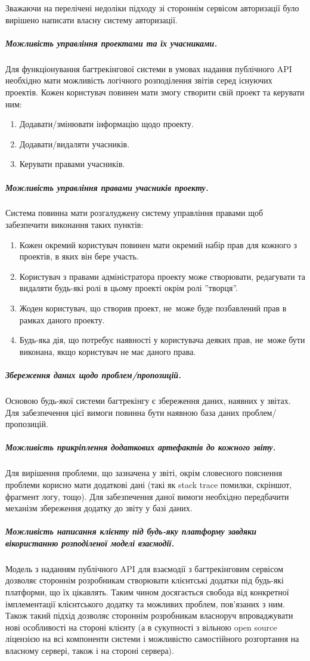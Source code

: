 \documentclass[../main.tex]{subfiles}
\begin{document}
			Зважаючи на перелічені недоліки підходу зі стороннім сервісом авторизації було вирішено написати власну систему авторизації.
		
		\subparagraph{Можливість управління проектами та їх учасниками.}
		Для функціонування багтрекінгової системи в умовах надання публічного API необхідно мати можливість логічного розподілення звітів серед існуючих проектів. Кожен користувач повинен мати змогу створити свій проект та керувати ним:
		\begin{enumerate}
			\item Додавати/змінювати інформацію щодо проекту.
			\item Додавати/видаляти учасників.
			\item Керувати правами учасників.
		\end{enumerate}
		
		\subparagraph{Можливість управління правами учасників проекту.}
		Система повинна мати розгалуджену систему управління правами щоб забезпечити виконання таких пунктів:
		\begin{enumerate}
			\item Кожен окремий користувач повинен мати окремий набір прав для кожного з проектів, в яких він бере участь.
			\item Користувач з правами адміністратора проекту може створювати, редагувати та видаляти будь-які ролі в цьому проекті окрім ролі ''творця''.
			\item Жоден користувач, що створив проект, не~може буде позбавлений прав в рамках даного проекту.
			\item Будь-яка дія, що потребує наявності у користувача деяких прав, не~може бути виконана, якщо користувач не має даного права.
		\end{enumerate}
		
		\subparagraph{Збереження даних щодо проблем/пропозицій.}
		Основою будь-якої системи багтрекінгу є збереження даних, наявних у звітах. Для забезпечення цієї вимоги повинна бути наявною база даних проблем/пропозицій.
		
		\subparagraph{Можливість прикріплення додаткових артефактів до кожного звіту.}
		Для вирішення проблеми, що зазначена у звіті, окрім словесного пояснення проблеми корисно мати додаткові дані (такі як stack trace помилки, скріншот, фрагмент логу, тощо). Для забезпечення даної вимоги необхідно передбачити механізм збереження додатку до звіту у базі даних.
		
		\subparagraph{Можливість написання клієнту під будь-яку платформу завдяки вікористанню розподіленої моделі взаємодії.}
		Модель з наданням публічного API для взаємодії з багтрекінговим сервісом дозволяє стороннім розробникам створювати клієнтські додатки під будь-які платформи, що їх цікавлять. Таким чином досягається свобода від конкретної імплементації клієнтського додатку та можливих проблем, пов'язаних з ним. Також такий підхід дозволяє стороннім розробникам власноруч впроваджувати нові особливості на стороні клієнту (а в сукупності з вільною open source ліцензією на всі компоненти системи і можливістю самостійного розгортання на власному сервері, також і на стороні сервера).
		
\end{document}
